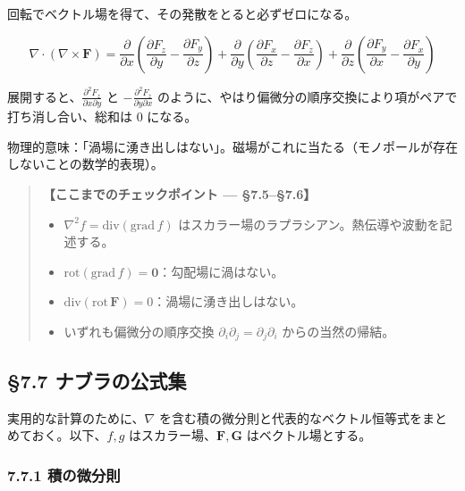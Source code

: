 \documentclass[a4paper,12pt,openany]{book}
\begin{document}
回転でベクトル場を得て、その発散をとると必ずゼロになる。

\[\nabla \cdot (\nabla \times \mathbf{F}) = \frac{\partial}{\partial x}\!\left(\frac{\partial F_z}{\partial y} - \frac{\partial F_y}{\partial z}\right) + \frac{\partial}{\partial y}\!\left(\frac{\partial F_x}{\partial z} - \frac{\partial F_z}{\partial x}\right) + \frac{\partial}{\partial z}\!\left(\frac{\partial F_y}{\partial x} - \frac{\partial F_x}{\partial y}\right)\]

展開すると、\(\frac{\partial^2 F_z}{\partial x\partial y}\) と
\(-\frac{\partial^2 F_z}{\partial y\partial x}\)
のように、やはり偏微分の順序交換により項がペアで打ち消し合い、総和は
\(0\) になる。

物理的意味：「渦場に湧き出しはない」。磁場がこれに当たる（モノポールが存在しないことの数学的表現）。

\begin{quote}
\textbf{【ここまでのチェックポイント — §7.5–§7.6】}

\begin{itemize}
\item
  \(\nabla^2 f = \mathrm{div}(\mathrm{grad}\,f)\)
  はスカラー場のラプラシアン。熱伝導や波動を記述する。
\item
  \(\mathrm{rot}(\mathrm{grad}\,f) = \mathbf{0}\)：勾配場に渦はない。
\item
  \(\mathrm{div}(\mathrm{rot}\,\mathbf{F}) = 0\)：渦場に湧き出しはない。
\item
  いずれも偏微分の順序交換
  \(\partial_i\partial_j = \partial_j\partial_i\) からの当然の帰結。
\end{itemize}
\end{quote}

\par\vspace{0.35em}\par

\hypertarget{ux30caux30d6ux30e9ux306eux516cux5f0fux96c6}{%
\subsection{§7.7
ナブラの公式集}\label{ux30caux30d6ux30e9ux306eux516cux5f0fux96c6}}

実用的な計算のために、\(\nabla\)
を含む積の微分則と代表的なベクトル恒等式をまとめておく。以下、\(f, g\)
はスカラー場、\(\mathbf{F}, \mathbf{G}\) はベクトル場とする。

\hypertarget{ux7a4dux306eux5faeux5206ux5247}{%
\subsubsection{7.7.1 積の微分則}\label{ux7a4dux306eux5faeux5206ux5247}}
\end{document}
